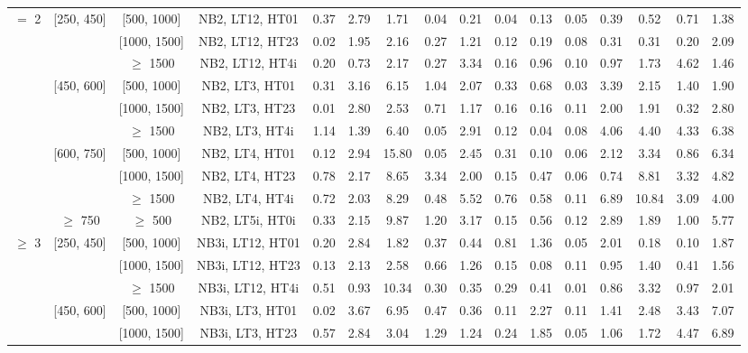 \begin{table}[ht]
\begin{center}
\begin{tabular}{|c | c | c | c | c | c | c | c | c | c | c | c | c | c | c | c | }
\cline{1-16} $=$ 2 & [250, 450] & [500, 1000]&NB2, LT12, HT01 & 0.37 & 2.79 & 1.71 & 0.04 & 0.21 & 0.04 & 0.13 & 0.05 & 0.39 & 0.52 & 0.71 & 1.38 \\ 
\cline{3-16}  & & [1000, 1500] &NB2, LT12, HT23 & 0.02 & 1.95 & 2.16 & 0.27 & 1.21 & 0.12 & 0.19 & 0.08 & 0.31 & 0.31 & 0.20 & 2.09 \\ 
\cline{3-16}  & & $\geq$ 1500 &NB2, LT12, HT4i & 0.20 & 0.73 & 2.17 & 0.27 & 3.34 & 0.16 & 0.96 & 0.10 & 0.97 & 1.73 & 4.62 & 1.46 \\ 
\cline{2-16}   & [450, 600] & [500, 1000]&NB2, LT3, HT01 & 0.31 & 3.16 & 6.15 & 1.04 & 2.07 & 0.33 & 0.68 & 0.03 & 3.39 & 2.15 & 1.40 & 1.90 \\ 
\cline{3-16}  & & [1000, 1500] &NB2, LT3, HT23 & 0.01 & 2.80 & 2.53 & 0.71 & 1.17 & 0.16 & 0.16 & 0.11 & 2.00 & 1.91 & 0.32 & 2.80 \\ 
\cline{3-16}  & & $\geq$ 1500 &NB2, LT3, HT4i & 1.14 & 1.39 & 6.40 & 0.05 & 2.91 & 0.12 & 0.04 & 0.08 & 4.06 & 4.40 & 4.33 & 6.38 \\ 
\cline{2-16}   & [600, 750] & [500, 1000]&NB2, LT4, HT01 & 0.12 & 2.94 & 15.80 & 0.05 & 2.45 & 0.31 & 0.10 & 0.06 & 2.12 & 3.34 & 0.86 & 6.34 \\ 
\cline{3-16}  & & [1000, 1500] &NB2, LT4, HT23 & 0.78 & 2.17 & 8.65 & 3.34 & 2.00 & 0.15 & 0.47 & 0.06 & 0.74 & 8.81 & 3.32 & 4.82 \\ 
\cline{3-16}  & & $\geq$ 1500 &NB2, LT4, HT4i & 0.72 & 2.03 & 8.29 & 0.48 & 5.52 & 0.76 & 0.58 & 0.11 & 6.89 & 10.84 & 3.09 & 4.00 \\ 
\cline{2-16}   & $\geq$ 750 & $\geq$ 500&NB2, LT5i, HT0i & 0.33 & 2.15 & 9.87 & 1.20 & 3.17 & 0.15 & 0.56 & 0.12 & 2.89 & 1.89 & 1.00 & 5.77 \\ 
\cline{1-16} $\geq$ 3 & [250, 450] & [500, 1000]&NB3i, LT12, HT01 & 0.20 & 2.84 & 1.82 & 0.37 & 0.44 & 0.81 & 1.36 & 0.05 & 2.01 & 0.18 & 0.10 & 1.87 \\ 
\cline{3-16}  & & [1000, 1500] &NB3i, LT12, HT23 & 0.13 & 2.13 & 2.58 & 0.66 & 1.26 & 0.15 & 0.08 & 0.11 & 0.95 & 1.40 & 0.41 & 1.56 \\ 
\cline{3-16}  & & $\geq$ 1500 &NB3i, LT12, HT4i & 0.51 & 0.93 & 10.34 & 0.30 & 0.35 & 0.29 & 0.41 & 0.01 & 0.86 & 3.32 & 0.97 & 2.01 \\ 
\cline{2-16}   & [450, 600] & [500, 1000]&NB3i, LT3, HT01 & 0.02 & 3.67 & 6.95 & 0.47 & 0.36 & 0.11 & 2.27 & 0.11 & 1.41 & 2.48 & 3.43 & 7.07 \\ 
\cline{3-16}  & & [1000, 1500] &NB3i, LT3, HT23 & 0.57 & 2.84 & 3.04 & 1.29 & 1.24 & 0.24 & 1.85 & 0.05 & 1.06 & 1.72 & 4.47 & 6.89 \\ 

\end{tabular}
\end{center}
\end{table}
